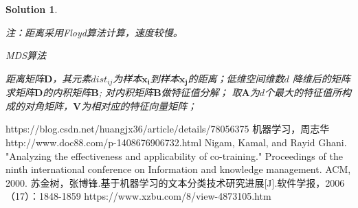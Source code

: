 \documentclass[a4paper,UTF8]{article}
\numberwithin{equation}{section}
\newtheorem*{solution}{Solution}
\begin{document}
\begin{solution}
\begin{enumerate}
    注：距离采用Floyd算法计算，速度较慢。
    
	\begin{algorithm}[htbp]  
	    \caption{MDS算法}  
	    \begin{algorithmic}[1] %
	 		\Require 距离矩阵$\mathbf{D}$，其元素$dist_{ij}$为样本$\mathbf{x_i}$到样本$\mathbf{x_j}$的距离；低维空间维数$d$
		    \Ensure 降维后的矩阵
		    \State 求矩阵$\mathbf{D}$的内积矩阵$\mathbf{B}$;
		    \State 对内积矩阵$\mathbf{B}$做特征值分解；
		    \State 取$\mathbf{A}$为$d$个最大的特征值所构成的对角矩阵，$\mathbf{V}$为相对应的特征向量矩阵；
	        \State {}
	   \end{algorithmic}  
	\end{algorithm} 
\end{enumerate}

\end{solution}
\newpage
\begin{thebibliography}{}
 https://blog.csdn.net/huangjx36/article/details/78056375
 机器学习，周志华
 http://www.doc88.com/p-1408676906732.html
 Nigam, Kamal, and Rayid Ghani. "Analyzing the effectiveness and applicability of co-training." Proceedings of the ninth international conference on Information and knowledge management. ACM, 2000.
 苏金树，张博锋.基于机器学习的文本分类技术研究进展[J].软件学报，2006（17）：1848-1859
 https://www.xzbu.com/8/view-4873105.htm
\end{thebibliography}
\end{document}
